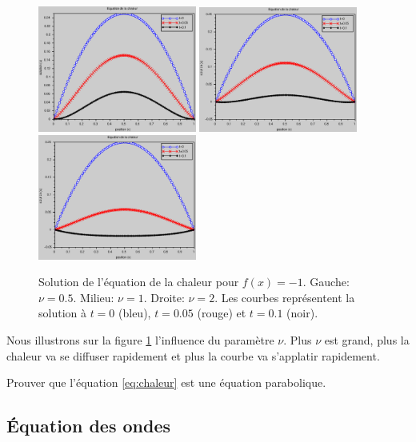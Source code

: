 \documentclass[12pt,a4paper,twoside]{article}
\begin{document}
\begin{figure}[h]
  \centering
  \includegraphics[width = 5.2cm]{Figures/chaleur_nu0_5.eps}
  \includegraphics[width = 5.2cm]{Figures/chaleur_nu1.eps}
  \includegraphics[width = 5.2cm]{Figures/chaleur_nu2.eps}
  \caption{Solution de l'\'equation de la chaleur
  pour $f(x) = -1$. Gauche: $\nu = 0.5$.
  Milieu: $\nu = 1$. Droite: $\nu = 2$.
  Les courbes repr\'esentent la solution \`a $t=0$ (bleu), $t=0.05$ (rouge) et $t=0.1$ (noir).}
  \label{fig:chaleur_nu}
\end{figure}


Nous illustrons sur la figure \ref{fig:chaleur_nu} l'influence du param\`etre $\nu$.
Plus $\nu$ est grand, plus la chaleur va se diffuser rapidement et plus 
la courbe va s'applatir rapidement.

\begin{exercise}
  Prouver que l'\'equation \eqref{eq:chaleur} est une \'equation parabolique.
\end{exercise}


\subsection{\'Equation des ondes}
\end{document}
